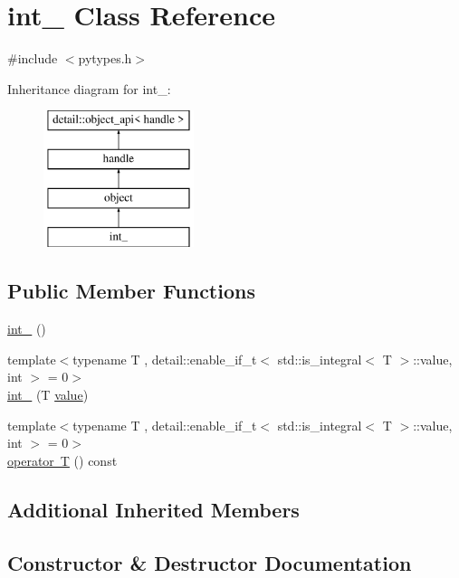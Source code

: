 \hypertarget{classint__}{}\section{int\+\_\+ Class Reference}
\label{classint__}


{\ttfamily \#include $<$pytypes.\+h$>$}

Inheritance diagram for int\+\_\+\+:\begin{figure}[H]
\begin{center}
\leavevmode
\includegraphics[height=4.000000cm]{classint__}
\end{center}
\end{figure}
\subsection*{Public Member Functions}
\begin{DoxyCompactItemize}
\item 
\mbox{\hyperlink{classint___a922bb28713c270f444ec1518b10e2578}{int\+\_\+}} ()
\item 
{\footnotesize template$<$typename T , detail\+::enable\+\_\+if\+\_\+t$<$ std\+::is\+\_\+integral$<$ T $>$\+::value, int $>$  = 0$>$ }\\\mbox{\hyperlink{classint___a9ec72c4afa30290e22b7ce250b6e537c}{int\+\_\+}} (T \mbox{\hyperlink{_s_d_l__opengl__glext_8h_a8ad81492d410ff2ac11f754f4042150f}{value}})
\item 
{\footnotesize template$<$typename T , detail\+::enable\+\_\+if\+\_\+t$<$ std\+::is\+\_\+integral$<$ T $>$\+::value, int $>$  = 0$>$ }\\\mbox{\hyperlink{classint___a1f05bd57ed8862505efec70e7341d15d}{operator T}} () const
\end{DoxyCompactItemize}
\subsection*{Additional Inherited Members}


\subsection{Constructor \& Destructor Documentation}
\mbox{\label{classint___a922bb28713c270f444ec1518b10e2578}} 
